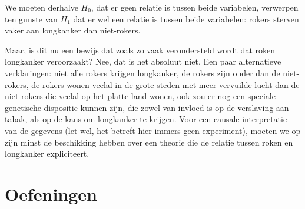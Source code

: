 We moeten derhalve $H_{0}$, dat er geen relatie is tussen beide variabelen, verwerpen ten gunste van $H_{1}$ dat er wel een relatie is tussen beide variabelen: rokers sterven vaker aan longkanker dan niet-rokers.

Maar, is dit nu een bewijs dat zoals zo vaak verondersteld wordt dat roken longkanker veroorzaakt? Nee, dat is het absoluut niet. Een paar alternatieve verklaringen: niet alle rokers krijgen longkanker, de rokers zijn ouder dan de niet-rokers, de rokers wonen veelal in de grote steden met
meer vervuilde lucht dan de niet-rokers die veelal op het platte land wonen, ook zou er nog een speciale genetische dispositie kunnen zijn, die zowel van invloed is op de verslaving aan tabak, als op de kans om longkanker te krijgen. Voor een causale interpretatie van de gegevens (let wel, het betreft hier immers geen experiment), moeten we op zijn minst de beschikking hebben over een theorie die de relatie tussen roken en longkanker expliciteert.

\section{Oefeningen}
\label{sec:chi-kwadraat-oefeningen}

